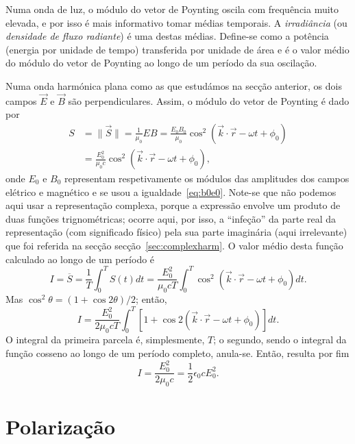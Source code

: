 Numa onda de luz, o módulo do vetor de Poynting oscila com frequência muito
elevada, e por isso é mais informativo tomar médias temporais. A
\emph{irradiância} (ou \emph{densidade de fluxo radiante}) é uma destas médias.
Define-se como a potência (energia por unidade de tempo) transferida por unidade
de área e é o valor médio do módulo do vetor de Poynting ao longo de um período
da sua oscilação.

Numa onda harmónica plana como as que estudámos na secção anterior, os dois
campos $\vec E$ e $\vec B$ são perpendiculares. Assim, o módulo do vetor de
Poynting é dado por
\begin{align*}
  S&=\|\vec S\|=\frac{1}{\mu_0}EB=
  \frac{E_0B_0}{\mu_0}\cos^2\left(\vec k\cdot\vec r-\omega t+\phi_0\right)\\
  &=
  \frac{E^2_0}{\mu_0c}\cos^2\left(\vec k\cdot\vec r-\omega t+\phi_0\right),
\end{align*}
onde $E_0$ e $B_0$ representam respetivamente os módulos das amplitudes dos
campos elétrico e magnético e se usou a igualdade~\eqref{eq:b0e0}. Note-se que
não podemos aqui usar a representação complexa, porque a expressão envolve um
produto de duas funções trignométricas; ocorre aqui, por isso, a ``infeção'' da
parte real da representação (com significado físico) pela sua parte imaginária
(aqui irrelevante) que foi referida na secção secção~\ref{sec:complexharm}.  O
valor médio desta função calculado ao longo de um período é
\begin{equation*}
  I=\overline S=\frac{1}{T}\int_{0}^TS(t)dt=\frac{E_0^2}{\mu_0cT}
  \int_0^T\cos^2\left(\vec k\cdot\vec r-\omega t+\phi_0\right)dt.
\end{equation*}
Mas $\cos^2\theta=(1+\cos2\theta)/2$; então,
\begin{equation*}
  I=\frac{E_0^2}{2\mu_0cT}
  \int_0^T\left[1+\cos2\left(\vec k\cdot\vec r-\omega t+\phi_0\right)\right]dt.
\end{equation*}
O integral da primeira parcela é, simplesmente, $T$; o segundo, sendo o integral
da função cosseno ao longo de um período completo, anula-se. Então, resulta por
fim
\begin{equation}
  I=\frac{E_0^2}{2\mu_0c}=\frac{1}{2}\epsilon_0cE_0^2.
\end{equation}


\section{Polarização}
\tobedone{}

